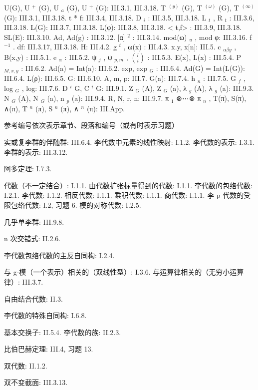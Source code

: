 U(G), U \(^{+}\) (G), U \(_{a}\) (G), U \(^{+}\) (G): III.3.1, III.3.18. T \(^{(y)}\) (G), T \(^{(\omega)}\) (G), T \(^{(\infty)}\) (G): III.3.1, III.3.18. t * f: III.3.4, III.3.18. D \(_{i}\) : III.3.5, III.3.18. L \(_{t}\) , R \(_{t}\) : III.3.6, III.3.18. L(G): III.3.7, III.3.18. L(φ): III.3.8, III.3.18. \textless{} t,f\textgreater{} : III.3.9, III.3.18. SL(E): III.3.10. Ad, Ad(g) : III.3.12. {[}α{]} \(^{2}\) : III.3.14. mod(ω) \(_{u}\) , mod φ: III.3.16. f \(^{-1}\) . df: III.3.17, III.3.18. H: III.4.2. g \(^{t}\) , ω(x) : III.4.3. x.y, x{[}n{]}: III.5. c \(_{\alpha\beta y}\) , B(x,y) : III.5.1. e \(_{\alpha}\) : III.5.2. ψ \(_{j}\) , ψ \(_{p,m}\) , \(\binom{l}{i}\) : III.5.3. E(x), L(x) : III.5.4. P \(_{M,x,y}\) : III.6.2. Ad(a) = Int(a): III.6.2. exp, exp \(_{G}\) : III.6.4. Ad(G) = Int(L(G)): III.6.4. L(ρ): III.6.5. G: III.6.10. A, m, p: III.7. G(a): III.7.4. h \(_{n}\) : III.7.5. G \(_{f}\) , log \(_{G}\) , log: III.7.6. D \(^{i}\) G, C \(^{i}\) G: III.9.1. Z \(_{G}\) (A), Z \(_{G}\) (a), λ \(_{g}\) (A), λ \(_{g}\) (a): III.9.3. N \(_{G}\) (A), N \(_{G}\) (a), n \(_{p}\) (a): III.9.4. R, N, r, n: III.9.7. π \(_{1}\) ⊗⋯⊗ π \(_{n}\) , T(π), S(π), ∧(π), T \(^{n}\) (π), S \(^{n}\) (π), ∧ \(^{n}\) (π): III.App.


参考编号依次表示章节、段落和编号（或有时表示习题）

实或复李群的伴随群: III.6.4. 李代数中元素的线性映射: I.1.2. 李代数的表示: I.3.1. 李群的表示: III.3.12.

阿多定理: I.7.3.

代数（不一定结合）: I.1.1. 由代数扩张标量得到的代数: I.1.1. 李代数的包络代数: I.2.1. 李代数: I.1.2. 相反代数: I.1.1. 乘积代数: I.1.1. 商代数: I.1.1. 李 p-代数的受限包络代数: I.2, 习题 6. 模的对称代数: I.2.5.

几乎单李群: III.9.8.

n 次交错式: II.2.6.

李代数包络代数的主反自同构: I.2.4.

与 g-模（一个表示）相关的（双线性型）: I.3.6. 与运算律相关的（无穷小运算律）: III.3.7.

自由结合代数: II.3.

李代数的特殊自同构: I.6.8.

基本交换子: II.5.4. 李代数的族: II.2.3.

比伯巴赫定理: III.4, 习题 13.

双代数: II.1.2.

双不变截面: III.3.13.

